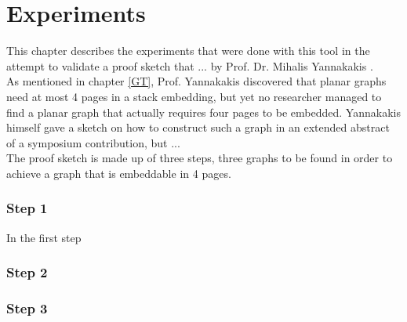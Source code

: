 
\chapter{Experiments}
  \label{Exp}
  
This chapter describes the experiments that were done with this tool in the attempt to validate a proof sketch that ... by Prof. Dr. Mihalis Yannakakis \cite{yannakakis1986four}.\\
As mentioned in chapter \autoref{GT}, Prof. Yannakakis discovered that planar graphs need at most 4 pages in a stack embedding, but yet no researcher managed to find a planar graph that actually requires four pages to be embedded.
Yannakakis himself gave a sketch on how to construct such a graph in an extended abstract of a symposium contribution, but ...\\
The proof sketch is made up of three steps, three graphs to be found in order to achieve a graph that is embeddable in 4 pages.\\

\subsection*{Step 1}
In the first step 
\subsection*{Step 2}
\subsection*{Step 3}

